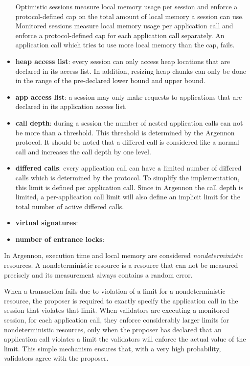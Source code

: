 \begin{itemize}
    Optimistic sessions measure local memory usage per session and enforce a protocol-defined cap on the total amount
    of local memory a session can use. Monitored sessions measure local memory usage per
    application call and enforce a protocol-defined cap for each application call separately. An application call
    which tries to use more local memory than the cap, fails.
    \item \textbf{heap access list}:
    every session can only access heap locations that are declared in its access list. In addition,
    resizing heap chunks can only be done in the range of the pre-declared lower bound and upper bound.
    \item \textbf{app access list}:
    a session may only make requests to applications that are declared in its application access list.
    \item \textbf{call depth}:
    during a session the number of nested application calls can not be more than a threshold. This threshold is
    determined by the Argennon protocol. It should be noted that a differed call is considered like a normal call and
    increases the call depth by one level.
    \item \textbf{differed calls}:
    every application call can have a limited number of differed calls which is determined by the protocol.
    To simplify the implementation, this limit is defined per application call. Since in Argennon the call depth is
    limited, a per-application call limit will also define an implicit limit for the total number of active differed
    calls.
    \item \textbf{virtual signatures}:
    \item \textbf{number of entrance locks}:
\end{itemize}

In Argennon, execution time and local memory are considered \emph{nondeterministic} resources. A nondeterministic
resource is a resource that can not be measured precisely and its measurement always contains a random error.

When a transaction fails due to violation of a limit for a nondeterministic resource, the proposer is
required to exactly specify the application call in the session that violates that limit. When validators are
executing a monitored session, for each application call, they enforce considerably larger limits for
nondeterministic resources, only when the proposer has declared that an application call violates a limit the
validators will enforce the actual value of the limit. This simple mechanism ensures that, with a very high
probability, validators agree with the proposer.


